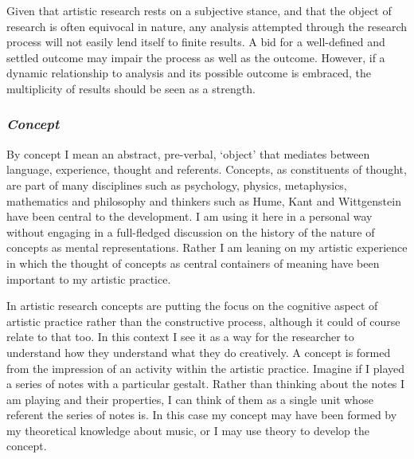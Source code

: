 \documentclass[12pt]{article}
\begin{document}
Given that artistic research rests on a subjective stance, and that the object of research is often equivocal in nature, any analysis attempted through the research process will not easily lend itself to finite results. A bid for a well-defined and settled outcome may impair the process as well as the outcome. However, if a dynamic relationship to analysis and its possible outcome is embraced, the multiplicity of results should be seen as a strength.



\subsubsection*{\emph{Concept}}
By concept I mean an abstract, pre-verbal, `object' that mediates between language, experience, thought and referents. Concepts, as constituents of thought, are part of many disciplines such as psychology, physics, metaphysics, mathematics and philosophy and thinkers such as Hume, Kant and Wittgenstein have been central to the development. I am using it here in a personal way without engaging in a full-fledged discussion on the history of the nature of concepts as mental representations. Rather I am leaning on my artistic experience in which the thought of concepts as central containers of meaning have been important to my artistic practice. 

In artistic research concepts are putting the focus on the cognitive aspect of artistic practice rather than the constructive process, although it could of course relate to that too. In this context I see it as a way for the researcher to understand how they understand what they do creatively. A concept is formed from the impression of an activity within the artistic practice. Imagine if I played a series of notes with a particular gestalt. Rather than thinking about the notes I am playing and their properties, I can think of them as a single unit whose referent the series of notes is. In this case my concept may have been formed by my theoretical knowledge about music, or I may use theory to develop the concept.
\end{document}

